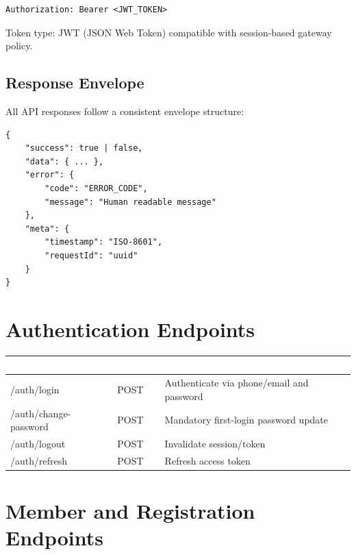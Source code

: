 \documentclass[11pt,a4paper]{article}
\begin{document}
\begin{lstlisting}
Authorization: Bearer <JWT_TOKEN>
\end{lstlisting}

Token type: JWT (JSON Web Token) compatible with session-based gateway policy.

\subsection{Response Envelope}
All API responses follow a consistent envelope structure:

\begin{lstlisting}
{
    "success": true | false,
    "data": { ... },
    "error": {
        "code": "ERROR_CODE",
        "message": "Human readable message"
    },
    "meta": {
        "timestamp": "ISO-8601",
        "requestId": "uuid"
    }
}
\end{lstlisting}

\section{Authentication Endpoints}

\begin{longtable}{@{}>{\ttfamily}p{}p{}p{}@{}}
\toprule
\rowcolor{primaryblue}
\textcolor{white}{\normalfont\textbf{Endpoint}} & \textcolor{white}{\textbf{Method}} & \textcolor{white}{\textbf{Description}} \\
\midrule
\endhead
/auth/login & POST & Authenticate via phone/email and password \\
\midrule
/auth/change-password & POST & Mandatory first-login password update \\
\midrule
/auth/logout & POST & Invalidate session/token \\
\midrule
/auth/refresh & POST & Refresh access token \\
\bottomrule
\end{longtable}

\section{Member and Registration Endpoints}
\end{document}
